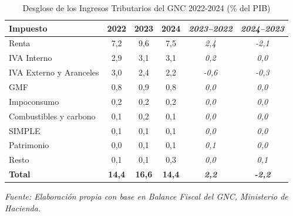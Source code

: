 \begin{table}
\centering
\caption{Desglose de los Ingresos Tributarios del GNC 2022-2024 (\% del PIB)}\label{tab:ingresos_tributarios}
\begin{tabular}{|l|c|c|c|c|c|}
\hline
\textbf{Impuesto} & \textbf{2022} & \textbf{2023} & \textbf{2024} & \textbf{\textit{2023–2022}} & \textbf{\textit{2024–2023}} \\
\hline
Renta                   & 7,2 & 9,6 & 7,5 & \textit{2,4}  & \textit{-2,1} \\
IVA Interno             & 2,9 & 3,1 & 3,1 & \textit{0,2}  & \textit{0,0} \\
IVA Externo y Aranceles & 3,0 & 2,4 & 2,2 & \textit{-0,6} & \textit{-0,3} \\
GMF                     & 0,8 & 0,9 & 0,8 & \textit{0,0}  & \textit{0,0} \\
Impoconsumo             & 0,2 & 0,2 & 0,2 & \textit{0,0}  & \textit{0,0} \\
Combustibles y carbono  & 0,1 & 0,2 & 0,1 & \textit{0,0}  & \textit{0,0} \\
SIMPLE                  & 0,1 & 0,1 & 0,1 & \textit{0,0}  & \textit{0,0} \\
Patrimonio              & 0,0 & 0,1 & 0,1 & \textit{0,1}  & \textit{0,0} \\
Resto                   & 0,1 & 0,1 & 0,3 & \textit{0,0}  & \textit{0,1} \\
\hline
\textbf{Total}          & \textbf{14,4} & \textbf{16,6} & \textbf{14,4} & \textbf{\textit{2,2}} & \textbf{\textit{-2,2}} \\
\hline
\end{tabular}
\vspace{0.1cm}
\par
\footnotesize{\textit{Fuente: Elaboración propia con base en Balance Fiscal del GNC, Ministerio de Hacienda.}}
\end{table}


